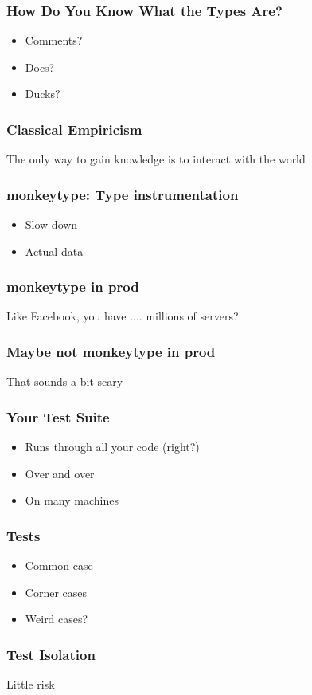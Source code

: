 \begin{frame}
\frametitle{How Do You Know What the Types Are?}

\begin{itemize}
\item Comments?
\item Docs?
\item Ducks?
\end{itemize}

\end{frame}

\begin{frame}
\frametitle{Classical Empiricism}

The only way to gain knowledge is to interact with the world

\end{frame}

\begin{frame}
\frametitle{monkeytype: Type instrumentation}

\begin{itemize}
\item Slow-down
\item Actual data
\end{itemize}
\end{frame}

\begin{frame}
\frametitle{monkeytype in prod}

Like Facebook, you have .... millions of servers?

\end{frame}

\begin{frame}
\frametitle{Maybe not monkeytype in prod}

That sounds a bit scary

\end{frame}

\begin{frame}
\frametitle{Your Test Suite}

\begin{itemize}
\item Runs through all your code (right?)
\item Over and over
\item On many machines
\end{itemize}

\end{frame}

\begin{frame}
\frametitle{Tests}
\begin{itemize}
\item Common case
\item Corner cases
\item Weird cases?
\end{itemize}
\end{frame}

\begin{frame}
\frametitle{Test Isolation}

Little risk

\end{frame}







